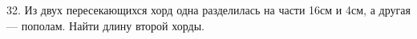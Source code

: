 32. Из двух пересекающихся хорд одна разделилась на части 16см и 4см, а другая --- пополам. Найти длину второй хорды.\\
